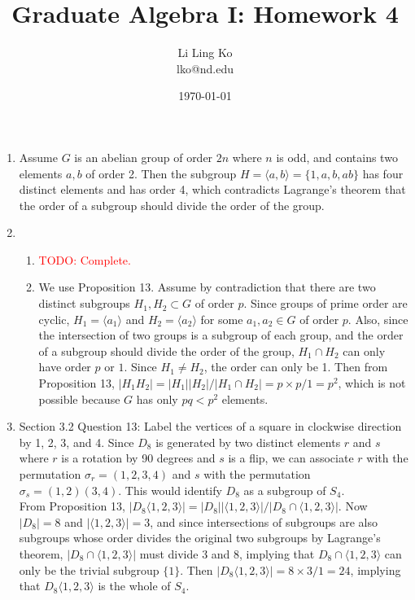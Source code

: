 \documentclass{article}
\newcommand{\TODO}[1]{\textcolor{red}{TODO: #1}}
\begin{document}
\title{Graduate Algebra I: Homework 4}
\author{Li Ling Ko\\ lko@nd.edu}
\date{\today}
\maketitle

\begin{enumerate}
  \item Assume $G$ is an abelian group of order $2n$ where $n$ is odd, and
    contains two elements $a,b$ of order 2. Then the subgroup $H=\langle
    a,b\rangle=\{1,a,b,ab\}$ has four distinct elements and has order 4,
    which contradicts Lagrange's theorem that the order of a subgroup should
    divide the order of the group.

  \item
    \begin{enumerate}
      \item \TODO{Complete.}

      \item We use Proposition 13. Assume by contradiction that there are
        two distinct subgroups $H_1,H_2\subset G$ of order $p$. Since
        groups of prime order are cyclic, $H_1=\langle a_1\rangle$ and
        $H_2=\langle a_2\rangle$ for some $a_1,a_2\in G$ of order $p$.
        Also, since the intersection of two groups is a subgroup of each
        group, and the order of a subgroup should divide the order of the
        group, $H_1\cap H_2$ can only have order $p$ or $1$. Since $H_1\neq
        H_2$, the order can only be 1. Then from Proposition 13,
        $|H_1H_2|=|H_1||H_2|/|H_1\cap H_2|=p\times p/1=p^2$, which is not
        possible because $G$ has only $pq<p^2$ elements.
    \end{enumerate}

  \item Section 3.2 Question 13: Label the vertices of a square in
    clockwise direction by 1, 2, 3, and 4. Since $D_8$ is generated by two
    distinct elements $r$ and $s$ where $r$ is a rotation by 90 degrees and
    $s$ is a flip, we can associate $r$ with the permutation
    $\sigma_r=(1,2,3,4)$ and $s$ with the permutation
    $\sigma_s=(1,2)(3,4)$. This would identify $D_8$ as a subgroup of
    $S_4$. \\

    From Proposition 13, $|D_8\langle 1,2,3\rangle|=|D_8||\langle
    1,2,3\rangle|/|D_8\cap\langle 1,2,3\rangle|$. Now $|D_8|=8$ and
    $|\langle 1,2,3\rangle|=3$, and since intersections of subgroups are
    also subgroups whose order divides the original two subgroups by
    Lagrange's theorem, $|D_8\cap\langle 1,2,3\rangle|$ must divide 3 and
    8, implying that $D_8\cap\langle 1,2,3\rangle$ can only be the trivial
    subgroup $\{1\}$. Then $|D_8\langle 1,2,3\rangle|=8\times 3/1=24$,
    implying that $D_8\langle 1,2,3\rangle$ is the whole of $S_4$. \\


\end{enumerate}
\end{document}
